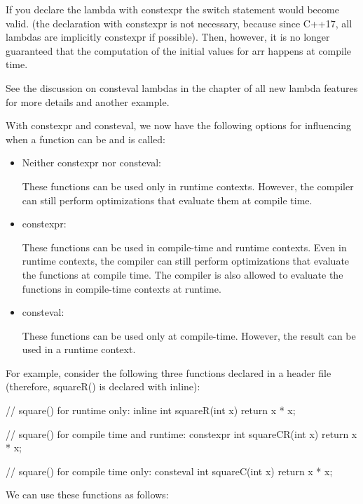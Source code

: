 If you declare the lambda with constexpr the switch statement would become valid. (the declaration with constexpr is not necessary, because since C++17, all lambdas are implicitly constexpr if possible). Then, however, it is no longer guaranteed that the computation of the initial values for arr happens at compile time.

See the discussion on consteval lambdas in the chapter of all new lambda features for more details and another example.


With constexpr and consteval, we now have the following options for influencing when a function can be and is called:

\begin{itemize}
\item 
Neither constexpr nor consteval: 

These functions can be used only in runtime contexts. However, the compiler can still perform optimizations that evaluate them at compile time.

\item 
constexpr: 

These functions can be used in compile-time and runtime contexts. Even in runtime contexts, the compiler can still perform optimizations that evaluate the functions at compile time. The compiler is also allowed to evaluate the functions in compile-time contexts at runtime.

\item 
consteval: 

These functions can be used only at compile-time. However, the result can be used in a runtime context.
\end{itemize}

For example, consider the following three functions declared in a header file (therefore, squareR() is declared with inline):


\begin{cpp}
// square() for runtime only:
inline int squareR(int x) {
	return x * x;
}

// square() for compile time and runtime:
constexpr int squareCR(int x) {
	return x * x;
}

// square() for compile time only:
consteval int squareC(int x) {
	return x * x;
}
\end{cpp}

We can use these functions as follows:


